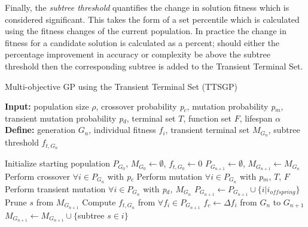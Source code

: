 \documentclass[a4paper, twocolumn]{article}
\begin{document}
\newline
Finally, the \textit{subtree threshold} quantifies the change in solution fitness which is considered significant. This takes the form of a set percentile which is calculated using the fitness changes of the current population. In practice the change in fitness for a candidate solution is calculated as a percent; should either the percentage improvement in accuracy or complexity be above the subtree threshold then the corresponding subtree is added to the Transient Terminal Set.
\begin{algorithm*}[h]
	\caption{Multi-objective GP using the Transient Terminal Set (TTSGP)}
	\hspace*{\algorithmicindent} \textbf{Input:} population size \(\rho\), crossover probability \textit{p$_{c}$}, mutation probability \textit{p$_{m}$}, transient mutation probability \textit{p$_{d}$}, terminal set \(T\), function set \(F\), lifespan \(\alpha\) \\
	\hspace*{\algorithmicindent} \textbf{Define:} generation \(G_{n}\), individual fitness \(f_{i}\), transient terminal set \(M_{G_{n}}\), subtree threshold \(f_{t, G_{n}}\) \\ 
	\begin{algorithmic}[1]
		\State Initialize starting population \textit{$ P_{G_{0}} $}, \(M_{G_{0}}\leftarrow \emptyset\), \(f_{t, G_{0}} \leftarrow 0\)
		 
		\State \(P_{G_{n+1}}\leftarrow \emptyset\), \(M_{G_{n+1}}\leftarrow M_{G_{n}}\)
			
		\State Perform crossover $\forall i\in P_{G_{n}}$ with \textit{p$_{c}$}
		\State Perform mutation $\forall i\in P_{G_{n}}$ with \textit{p$_{m}$}, \(T\), \(F\)
		\State Perform transient mutation $\forall i\in P_{G_{n}}$ with \textit{p$_{d}$, \(M_{G_{n}}\)}
		\State $P_{G_{n+1}} \leftarrow P_{G_{n+1}}\cup \{i | i_{offspring}\}$
		\EndWhile\newline
			
		\State Prune \(s\) from \(M_{G_{n+1}}\)
		\EndIf
		\EndFor
		\State Compute $f_{t, G_{n}}$ from $\forall f_{i} \in P_{G_{n+1}}$
		\State $f_{c}\leftarrow \Delta f_{i}$ from \(G_{n}\) to \(G_{n+1}\)
		\State \(M_{G_{n+1}} \leftarrow M_{G_{n+1}} \cup \{\)subtree \(s\in i \}\)
		\EndIf
		\EndFor 
		\EndWhile
\end{algorithmic}\end{algorithm*}
\end{document}
